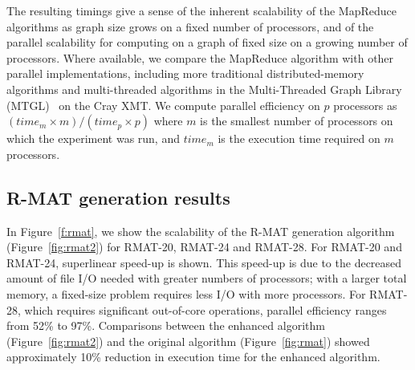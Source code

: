 The resulting timings give a sense of the inherent scalability of the
MapReduce algorithms as graph size grows on a fixed number of
processors, and of the parallel scalability for computing on a graph
of fixed size on a growing number of processors.  Where available, we
compare the MapReduce algorithm with other parallel implementations,
including more traditional distributed-memory algorithms and 
multi-threaded algorithms
in the Multi-Threaded Graph Library (MTGL)~\cite{MTGL} on the Cray XMT.
We compute parallel efficiency on $p$ processors
as $({time}_{m} \times m) / ({time}_p \times p)$
where $m$ is the smallest number of processors on which the experiment
was run, and ${time}_m$ is the execution time required on $m$ processors.

\subsection{R-MAT generation results}

In Figure~\ref{f:rmat}, we show the scalability of the R-MAT generation 
algorithm (Figure~\ref{fig:rmat2}) for RMAT-20, RMAT-24 and RMAT-28.  For
RMAT-20 and RMAT-24, superlinear speed-up is shown.  This speed-up is due
to the decreased amount of file I/O needed with greater numbers of 
processors; with a larger total memory, a fixed-size problem requires
less I/O with more processors.  For RMAT-28, which requires
significant out-of-core operations, parallel efficiency ranges from 52\% to
97\%.  Comparisons between the enhanced algorithm (Figure~\ref{fig:rmat2}) and
the original algorithm (Figure~\ref{fig:rmat}) showed approximately 
10\% reduction in execution time for the enhanced algorithm.



